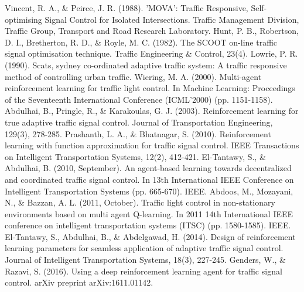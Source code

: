 \documentclass[conference]{IEEEtran}
\begin{document}
%
%
%
\begin{thebibliography}{1}
 Vincent, R. A., \& Peirce, J. R. (1988). 'MOVA': Traffic Responsive, Self-optimising Signal Control for Isolated Intersections. Traffic Management Division, Traffic Group, Transport and Road Research Laboratory.
 Hunt, P. B., Robertson, D. I., Bretherton, R. D., \& Royle, M. C. (1982). The SCOOT on-line traffic signal optimisation technique. Traffic Engineering \& Control, 23(4).
 Lowrie, P. R. (1990). Scats, sydney co-ordinated adaptive traffic system: A traffic responsive method of controlling urban traffic.
 Wiering, M. A. (2000). Multi-agent reinforcement learning for traffic light control. In Machine Learning: Proceedings of the Seventeenth International Conference (ICML'2000) (pp. 1151-1158).
 Abdulhai, B., Pringle, R., \& Karakoulas, G. J. (2003). Reinforcement learning for true adaptive traffic signal control. Journal of Transportation Engineering, 129(3), 278-285.
 Prashanth, L. A., \& Bhatnagar, S. (2010). Reinforcement learning with function approximation for traffic signal control. IEEE Transactions on Intelligent Transportation Systems, 12(2), 412-421.
 El-Tantawy, S., \& Abdulhai, B. (2010, September). An agent-based learning towards decentralized and coordinated traffic signal control. In 13th International IEEE Conference on Intelligent Transportation Systems (pp. 665-670). IEEE.
 Abdoos, M., Mozayani, N., \& Bazzan, A. L. (2011, October). Traffic light control in non-stationary environments based on multi agent Q-learning. In 2011 14th International IEEE conference on intelligent transportation systems (ITSC) (pp. 1580-1585). IEEE.
 El-Tantawy, S., Abdulhai, B., \& Abdelgawad, H. (2014). Design of reinforcement learning parameters for seamless application of adaptive traffic signal control. Journal of Intelligent Transportation Systems, 18(3), 227-245.
 Genders, W., \& Razavi, S. (2016). Using a deep reinforcement learning agent for traffic signal control. arXiv preprint arXiv:1611.01142.

\end{thebibliography}
\end{document}
